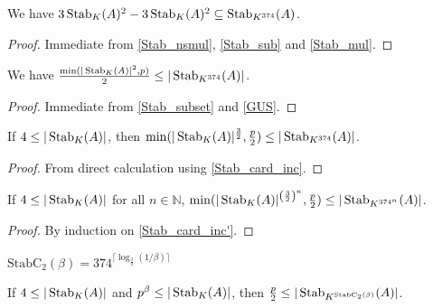 \begin{lemma}
    \label{Stab_subset}
    \leanok
    We have $3 \operatorname{\operatorname{Stab}}_K(A)^2 - 3 \operatorname{\operatorname{Stab}}_K(A)^2 \subseteq \operatorname{\operatorname{Stab}}_{K^{374}}(A)$.
\end{lemma}

\begin{proof}
    \leanok
    Immediate from \ref{Stab_nsmul}, \ref{Stab_sub} and \ref{Stab_mul}.
\end{proof}

\begin{lemma}
    \label{Stab_card_inc}
    \leanok
    We have $\frac{\min(|\operatorname{\operatorname{Stab}}_K(A)|^2, p)}2 \leq |\operatorname{\operatorname{Stab}}_{K^{374}}(A)|$.
\end{lemma}

\begin{proof}
    \leanok
    Immediate from \ref{Stab_subset} and \ref{GUS}.
\end{proof}

\begin{lemma}
    \label{Stab_card_inc'}
    \leanok
    If $4 \leq |\operatorname{\operatorname{Stab}}_K(A)|$, then $\min(|\operatorname{\operatorname{Stab}}_K(A)|^{\frac32}, \frac p2) \leq |\operatorname{\operatorname{Stab}}_{K^{374}}(A)|$.
\end{lemma}

\begin{proof}
    \leanok
    From direct calculation using \ref{Stab_card_inc}.
\end{proof}

\begin{lemma}
    \label{Stab_card_inc_rep}
    \leanok
    If $4 \leq |\operatorname{\operatorname{Stab}}_K(A)|$ for all $n \in \mathbb{N}$,
    $\min(|\operatorname{\operatorname{Stab}}_K(A)|^{\left(\frac32\right)^n}, \frac p2) \leq |\operatorname{\operatorname{Stab}}_{K^{374^n}}(A)|$.
\end{lemma}

\begin{proof}
    \leanok
    By induction on \ref{Stab_card_inc'}.
\end{proof}

\begin{definition}
    \label{StabC_2}
    \leanok
    $\mathrm{StabC}_2(\beta) = 374^{\lceil \log_{\frac32}(1 / \beta) \rceil}$
\end{definition}

\begin{lemma}
    \label{Stab_full'}
    \leanok
    If $4 \leq |\operatorname{\operatorname{Stab}}_K(A)|$ and $p^\beta \leq |\operatorname{\operatorname{Stab}}_K(A)|$,
    then $\frac{p}2 \leq |\operatorname{\operatorname{Stab}}_{K^{\mathrm{StabC}_2(\beta)}}(A)|$.
\end{lemma}

